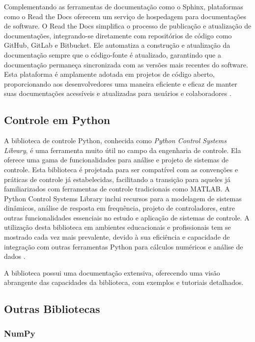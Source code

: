 Complementando as ferramentas de documentação como o Sphinx, plataformas como o Read the Docs oferecem um serviço de
hospedagem para documentações de software.
O Read the Docs simplifica o processo de publicação e atualização de documentações, integrando-se diretamente com
repositórios de código como GitHub, GitLab e Bitbucket.
Ele automatiza a construção e atualização da documentação sempre que o código-fonte é atualizado, garantindo que a
documentação permaneça sincronizada com as versões mais recentes do software.
Esta plataforma é amplamente adotada em projetos de código aberto, proporcionando aos desenvolvedores uma maneira
eficiente e eficaz de manter suas documentações acessíveis e atualizadas para usuários e colaboradores \cite{rtd}.

\subsection{Controle em Python}

A biblioteca de controle Python, conhecida como \textit{Python Control Systems Library}, é uma ferramenta muito útil no campo da
engenharia de controle.
Ela oferece uma gama de funcionalidades para análise e projeto de sistemas de controle.
Esta biblioteca é projetada para ser compatível com as convenções e práticas de controle já estabelecidas, facilitando
a transição para aqueles já familiarizados com ferramentas de controle tradicionais como MATLAB\@.
A Python Control Systems Library inclui recursos para a modelagem de sistemas dinâmicos, análise de resposta em
frequência, projeto de controladores, entre outras funcionalidades essenciais no estudo e aplicação de sistemas de
controle.
A utilização desta biblioteca em ambientes educacionais e profissionais tem se mostrado cada vez mais prevalente,
devido à sua eficiência e capacidade de integração com outras ferramentas Python para cálculos numéricos e análise de
dados \cite{ctrlib}.

A biblioteca possui uma documentação extensiva, oferecendo uma visão abrangente das capacidades da biblioteca,
com exemplos e tutoriais detalhados.

\subsection{Outras Bibliotecas}

\subsubsection{NumPy}

